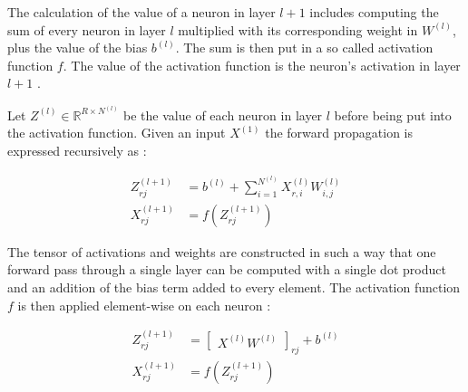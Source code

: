 \documentclass[a4paper, twoside]{article}
\begin{document}
The calculation of the value of a neuron in layer $l+1$ includes computing the sum of every neuron in layer $l$ multiplied with its corresponding weight in $W^{(l)}$, plus the value of the bias $b^{(l)}$. The sum is then put in a so called activation function $f$. The value of the activation function is the neuron's activation in layer $l+1$ \cite{cs231n} \cite{wikiStanford}.

Let $Z^{(l)} \in \mathbb{R}^{R \times N^{(l)}}$ be the value of each neuron in layer $l$ before being put into the activation function. Given an input $X^{(1)}$ the forward propagation is expressed recursively as \cite{cs231n} \cite{wikiStanford}:

\begin{align}
Z_{rj}^{(l+1)} & = b^{(l)} + \sum^{N^{(l)}}_{i = 1} X^{(l)}_{r,i} W^{(l)}_{i,j}\\
X_{rj}^{(l+1)} & = f(Z_{rj}^{(l+1)})
\end{align}

The tensor of activations and weights are constructed in such a way that one forward pass through a single layer can be computed with a single dot product and an addition of the bias term added to every element. The activation function $f$ is then applied element-wise on each neuron \cite{cs231n} \cite{wikiStanford}:

\begin{align}
Z_{rj}^{(l+1)} & = \begin{bmatrix}
X^{(l)}W^{(l)}
\end{bmatrix}_{rj}+b^{(l)} \\
X_{rj}^{(l+1)} & = f(Z_{rj}^{(l+1)})
\end{align}
\end{document}

